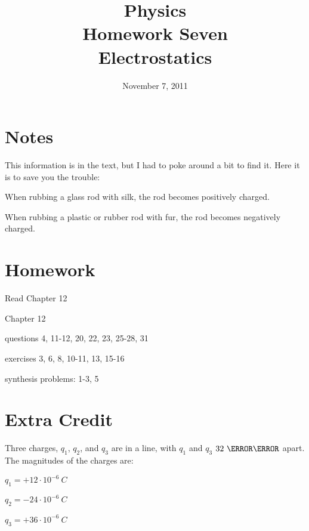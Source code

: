 \documentclass{exam}
\title{Physics \\ Homework Seven \\ Electrostatics}
\date{November 7, 2011}
\begin{document}
\maketitle

\ifprintanswers
\else
\section{Notes}

This information is in the text, but I had to poke around a bit to find it.  Here it is to save you the trouble:

\begin{itemize*}
\item When rubbing a glass rod with silk, the rod becomes positively charged.
\item When rubbing a plastic or rubber rod with fur, the rod becomes negatively charged.
\end{itemize*}

\fi

\section{Homework}

\begin{itemize*}
  \item Read Chapter 12
  \item Chapter 12
    \begin{itemize*}
      \item questions 4, 11-12, 20, 22, 23, 25-28, 31
      \item exercises 3, 6, 8, 10-11, 13, 15-16
      \item synthesis problems: 1-3, 5
    \end{itemize*}
\end{itemize*}

\section{Extra Credit}
Three charges, $q_1$, $q_2$, and $q_3$ are in a line, with $q_1$ and $q_3$ $32 \ \centi \meter$ apart.  The magnitudes of the charges
are:
\begin{itemize*}
\item $q_1 = +12 \cdot 10^{-6} \ C$
\item $q_2 = -24 \cdot 10^{-6} \ C$
\item $q_3 = +36 \cdot 10^{-6} \ C$
\end{itemize*}
\end{document}
